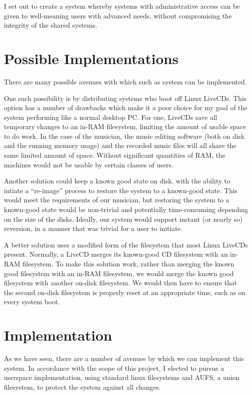 \documentclass[12pt]{article}
\begin{document}
I set out to create a system whereby systems with administrative access
can be given to well-meaning users with advanced needs, without compromising
the integrity of the shared systems. 

\section{Possible Implementations}
There are many possible avenues with which such as system can be implemented.

One such possibility is by distributing systems who boot off Linux LiveCDs.
This option has a number of drawbacks which make it a poor choice for my goal
of the system performing like a normal desktop PC.  For one, LiveCDs save all
temporary changes to an in-RAM filesystem, limiting the amount of usable space
to do work.  In the case of the musician, the music editing software (both on
disk and the running memory usage) and the recorded music files will all
share the same limited amount of space.  Without significant quantities of RAM,
the machines would not be usable by certain classes of users.

Another solution could keep a known good state on disk, with the ability to
intiate a ``re-image'' process to restore the system to a known-good state.
This would meet the requirements of our musician, but restoring the system
to a known-good state would be non-trivial and potentially time-consuming 
depending on the size of the disks.  Ideally, our system would support 
instant (or nearly so) reversion, in a manner that was trivial for a user
to initiate.

A better solution uses a modified form of the filesystem that most Linux 
LiveCDs present. Normally, a LiveCD merges its known-good CD filesystem 
with an in-RAM filesystem. To make this solution work, rather than 
merging the known good filesystem with an in-RAM filesystem, we would 
merge the known good filesystem with another on-disk filesystem.  We would
then have to ensure that the second on-disk filesystem is properly reset 
at an appropriate time, such as on every system boot.

\section{Implementation}

As we have seen, there are a number of avenues by which we can implement this 
system.  In accordance with the scope of this project, I elected to pursue
a userspace implementation, using standard linux filesystems and AUFS, a
union filesystem, to protect the system against all changes.
\end{document}
